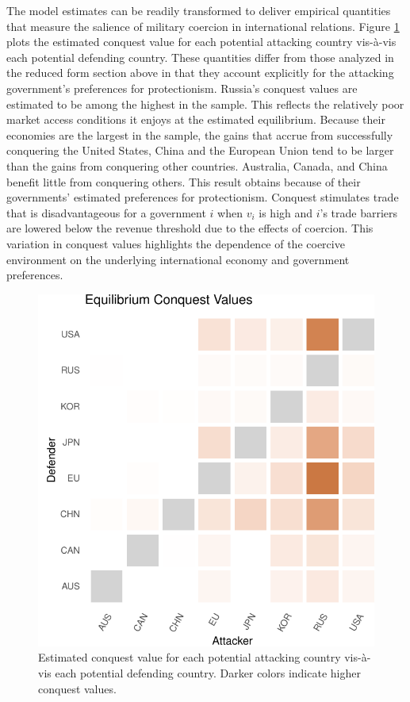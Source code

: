 \documentclass{puthesis}
\begin{document}
The model estimates can be readily transformed to deliver empirical
quantities that measure the salience of military coercion in
international relations. Figure \ref{fig:rcv} plots the estimated
conquest value for each potential attacking country vis-à-vis each
potential defending country. These quantities differ from those analyzed
in the reduced form section above in that they account explicitly for
the attacking government's preferences for protectionism. Russia's
conquest values are estimated to be among the highest in the sample.
This reflects the relatively poor market access conditions it enjoys at
the estimated equilibrium. Because their economies are the largest in
the sample, the gains that accrue from successfully conquering the
United States, China and the European Union tend to be larger than the
gains from conquering other countries. Australia, Canada, and China
benefit little from conquering others. This result obtains because of
their governments' estimated preferences for protectionism. Conquest
stimulates trade that is disadvantageous for a government \(i\) when
\(v_i\) is high and \(i\)'s trade barriers are lowered below the revenue
threshold due to the effects of coercion. This variation in conquest
values highlights the dependence of the coercive environment on the
underlying international economy and government preferences.

\begin{figure}
\centering
\includegraphics{figure/rcv-1.pdf}
\caption{Estimated conquest value for each potential attacking country
vis-à-vis each potential defending country. Darker colors indicate
higher conquest values. \label{fig:rcv}}
\end{figure}
\end{document}
